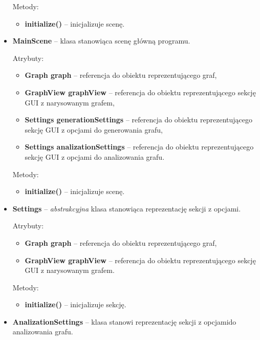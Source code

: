\documentclass{article}
\begin{document}
\begin{itemize}
    Metody:
    \begin{itemize}
        \item \textbf{initialize()} -- inicjalizuje scenę.
    \end{itemize}
    
\newpage
    
    \item \textbf{MainScene} -- klasa stanowiąca scenę główną programu.
    
    Atrybuty:
    \begin{itemize}
        \item \textbf{Graph graph} -- referencja do obiektu reprezentującego graf,
        \item \textbf{GraphView graphView} -- referencja do obiektu reprezentującego sekcję GUI z narysowanym grafem,
        \item \textbf{Settings generationSettings} -- referencja do obiektu reprezentującego sekcję GUI z opcjami do generowania grafu,
        \item \textbf{Settings analizationSettings} -- referencja do obiektu reprezentującego sekcję GUI z opcjami do analizowania grafu.
    \end{itemize}
    
    Metody:
    \begin{itemize}
        \item \textbf{initialize()} -- inicjalizuje scenę.
    \end{itemize}
    
    \item \textbf{Settings} -- \emph{abstrakcyjna} klasa stanowiąca reprezentację sekcji z opcjami.
    
    Atrybuty:
    \begin{itemize}
        \item \textbf{Graph graph} -- referencja do obiektu reprezentującego graf,
        \item \textbf{GraphView graphView} -- referencja do obiektu reprezentującego sekcję GUI z narysowanym grafem.
    \end{itemize}
    
    Metody:
    \begin{itemize}
        \item \textbf{initialize()} -- inicjalizuje sekcję.
    \end{itemize}
    
    \item \textbf{AnalizationSettings} -- klasa stanowi reprezentację sekcji z opcjami\linebreak do analizowania grafu.
    

\end{itemize}
\end{document}
